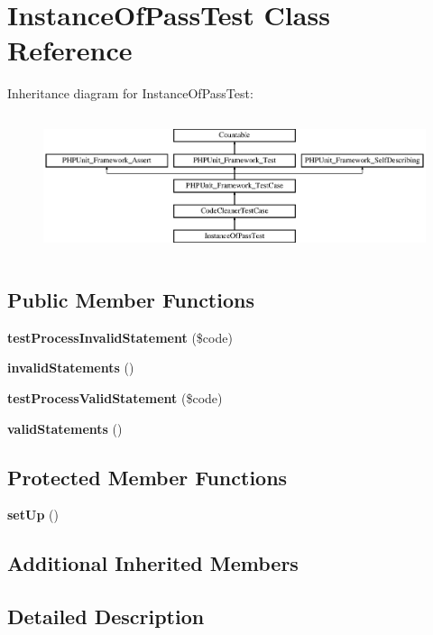 \section{Instance\+Of\+Pass\+Test Class Reference}
\label{class_psy_1_1_test_1_1_code_cleaner_1_1_instance_of_pass_test}
Inheritance diagram for Instance\+Of\+Pass\+Test\+:\begin{figure}[H]
\begin{center}
\leavevmode
\includegraphics[height=4.129793cm]{class_psy_1_1_test_1_1_code_cleaner_1_1_instance_of_pass_test}
\end{center}
\end{figure}
\subsection*{Public Member Functions}
\begin{DoxyCompactItemize}
\item 
{\bf test\+Process\+Invalid\+Statement} (\$code)
\item 
{\bf invalid\+Statements} ()
\item 
{\bf test\+Process\+Valid\+Statement} (\$code)
\item 
{\bf valid\+Statements} ()
\end{DoxyCompactItemize}
\subsection*{Protected Member Functions}
\begin{DoxyCompactItemize}
\item 
{\bf set\+Up} ()
\end{DoxyCompactItemize}
\subsection*{Additional Inherited Members}


\subsection{Detailed Description}


